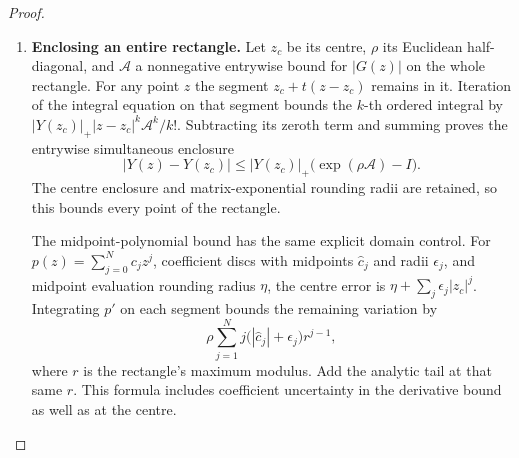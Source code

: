 \begin{proof}
\begin{enumerate}[label={$\langle1\rangle$\arabic*.}]
\begin{enumerate}[label={$\langle2\rangle$\arabic*.},leftmargin=*]
Use $w=(1,1/128,1/128,1/32,1/64,1/32)$ and
\[
 \mathfrak b=\max_i\sum_{j,k}|(B_k)_{ij}|\frac{w_j}{w_i}.
\]
On a ray of radius $t<1$ the connection norm is at most
$\mathfrak b/(1-t^m)$. The scalar Gronwall inequality
\cite[Lemma~2.7, pp.~42--43]{TeschlODE2012} applies to the matrix integral equation. The elementary estimate
\[
 \frac1{1-t^m}\le\frac1{m(1-t)}+\frac{m-1}{m}
\]
holds because its numerator difference is
$\bigl(\sum_{j=1}^{m-1}t^j-(m-1)t^m\bigr)/m\ge0$.
Consequently
\[
 \|U(z)\|_w\le K(R):=
 \exp\!\left\{\mathfrak b\left[-\frac{\log(1-R)}m
                 +\frac{m-1}{m}R\right]\right\}
 \quad (|z|\le R<1).
\]
Cauchy's coefficient integral, with the positively oriented circle
of radius $R$ \cite[\S1.9(iii), (1.9.30)--(1.9.31)]{DLMFCauchy2026},
gives $\|U_n\|_w\le K(R)R^{-n}$. Hence the error after degree $N$
on the whole disc $|z|\le r<R$ is
\[
 \tau_N(r;R)=K(R)\frac{(r/R)^{N+1}}{1-r/R}.\tag{1.18.3}
\]
Its $ij$ entry is bounded by $\tau_Nw_i/w_j$; after left
multiplication by $H_c$ the bound is
$\tau_N\sum_l|(H_c)_{il}|_+w_l/w_j$.
The computation stores coefficients through $N=3000$ and
uses $R=999/1000$.  A shorter prefix may be evaluated at a centre;
its own degree and modulus are used in the same tail formula.
On the central squares the whole-square modulus is used.
Every coefficient and evaluation radius is retained. Polynomial
evaluation is grouped into blocks of 32 coefficients; this is the
identity $p(z)=\sum_j z^{32j}p_j(z)$, with no change of polynomial
or of its error bound.

\item \textbf{Enclosing an entire rectangle.}
Let $z_c$ be its centre, $\rho$ its Euclidean half-diagonal, and
$\mathcal A$ a nonnegative entrywise bound for $|G(z)|$ on the
whole rectangle. For any point $z$ the segment
$z_c+t(z-z_c)$ remains in it. Iteration of the integral equation
on that segment bounds the $k$-th ordered integral by
$|Y(z_c)|_+|z-z_c|^k\mathcal A^k/k!$. Subtracting its zeroth term
and summing proves the entrywise simultaneous enclosure
\[
 |Y(z)-Y(z_c)|
 \le |Y(z_c)|_+\bigl(\exp(\rho\mathcal A)-I\bigr).
\]
The centre enclosure and matrix-exponential rounding radii are
retained, so this bounds every point of the rectangle.

The midpoint-polynomial bound has the same explicit domain
control. For $p(z)=\sum_{j=0}^Nc_jz^j$, coefficient discs with
midpoints $\widehat c_j$ and radii $\epsilon_j$, and midpoint
evaluation rounding radius $\eta$, the centre error is
$\eta+\sum_j\epsilon_j|z_c|^j$. Integrating $p'$ on each segment
bounds the remaining variation by
\[
 \rho\sum_{j=1}^N j\bigl(|\widehat c_j|+\epsilon_j\bigr)r^{j-1},
\]
where $r$ is the rectangle's maximum modulus. Add the analytic
tail at that same $r$. This formula includes coefficient
uncertainty in the derivative bound as well as at the centre.


\end{enumerate}
\end{enumerate}
\end{proof}
